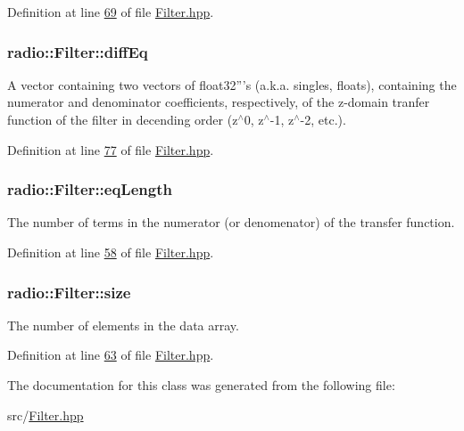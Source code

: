 Definition at line \hyperlink{Filter_8hpp_source_l00069}{69} of file \hyperlink{Filter_8hpp_source}{Filter.\+hpp}.

\hypertarget{classradio_1_1Filter_abe705768a267844edfa2aaabfdac9f56}{
\subsubsection[{diff\+Eq}]{ radio\+::\+Filter\+::diff\+Eq\hspace{0.3cm}{\ttfamily [protected]}}}\label{classradio_1_1Filter_abe705768a267844edfa2aaabfdac9f56}
A vector containing two vectors of float32'''s (a.\+k.\+a. singles, floats), containing the numerator and denominator coefficients, respectively, of the z-\/domain tranfer function of the filter in decending order (z$^\wedge$0, z$^\wedge$-\/1, z$^\wedge$-\/2, etc.). 

Definition at line \hyperlink{Filter_8hpp_source_l00077}{77} of file \hyperlink{Filter_8hpp_source}{Filter.\+hpp}.

\hypertarget{classradio_1_1Filter_a26a32320c4dffa8925ab5f0f06689e8d}{
\subsubsection[{eq\+Length}]{ radio\+::\+Filter\+::eq\+Length\hspace{0.3cm}{\ttfamily [protected]}}}\label{classradio_1_1Filter_a26a32320c4dffa8925ab5f0f06689e8d}
The number of terms in the numerator (or denomenator) of the transfer function. 

Definition at line \hyperlink{Filter_8hpp_source_l00058}{58} of file \hyperlink{Filter_8hpp_source}{Filter.\+hpp}.

\hypertarget{classradio_1_1Filter_a7285b4c7263d8278e38abb14b5dca5d9}{
\subsubsection[{size}]{ radio\+::\+Filter\+::size\hspace{0.3cm}{\ttfamily [protected]}}}\label{classradio_1_1Filter_a7285b4c7263d8278e38abb14b5dca5d9}
The number of elements in the data array. 

Definition at line \hyperlink{Filter_8hpp_source_l00063}{63} of file \hyperlink{Filter_8hpp_source}{Filter.\+hpp}.



The documentation for this class was generated from the following file\+:\begin{DoxyCompactItemize}
\item 
src/\hyperlink{Filter_8hpp}{Filter.\+hpp}\end{DoxyCompactItemize}

